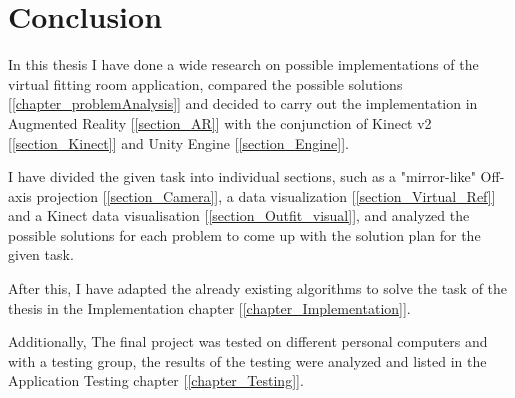 \documentclass[a4paper]{report}
\begin{document}
\chapter{Conclusion}


\qquad In this thesis I have done a wide research on possible implementations of the virtual fitting room application, compared the possible solutions [\ref{chapter_problemAnalysis}] and decided to carry out the implementation in Augmented Reality [\ref{section_AR}] with the conjunction of Kinect v2 [\ref{section_Kinect}] and Unity Engine [\ref{section_Engine}]. 


I have divided the given task into individual sections, such as a "mirror-like" Off-axis projection [\ref{section_Camera}], a data visualization [\ref{section_Virtual_Ref}] and a Kinect data visualisation [\ref{section_Outfit_visual}], and analyzed the possible solutions for each problem to come up with the solution plan for the given task. 

After this, I have adapted the already existing algorithms to solve the task of the thesis in the Implementation chapter [\ref{chapter_Implementation}].

Additionally, The final project was tested on different personal computers and with a testing group, the results of the testing were analyzed and listed in the Application Testing chapter [\ref{chapter_Testing}]. 
























\end{document}
